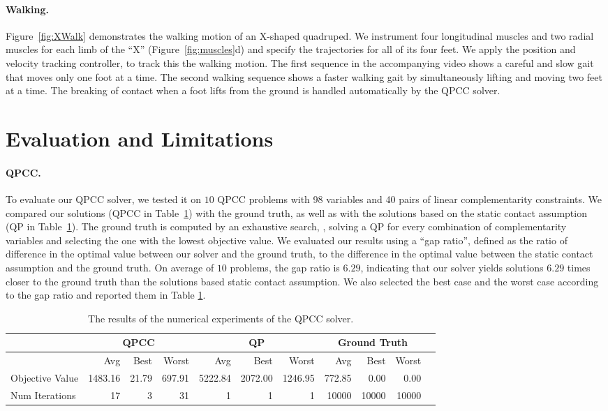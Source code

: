 \paragraph{Walking.} Figure~\ref{fig:XWalk} demonstrates the walking
motion of an X-shaped quadruped. We instrument four longitudinal
muscles and two radial muscles for each limb of the ``X''
(Figure~\ref{fig:muscles}d) and specify the trajectories for all of
its four feet. We apply the position and velocity tracking controller, to track this the walking motion.
The first sequence in the accompanying video shows a careful and slow gait that moves only one
foot at a time. The second walking sequence shows a faster walking
gait by simultaneously lifting and moving two feet at a time. The
breaking of contact when a foot lifts from the ground is handled
automatically by the QPCC solver.

\section{Evaluation and Limitations}
\label{sec:Evaluation}

\paragraph{QPCC.} To evaluate our QPCC solver, we tested it on $10$
QPCC problems with 98 variables and 40 pairs of linear complementarity
constraints. We compared our solutions (QPCC in Table~\ref{tab:qpcc}) with the ground truth, as well
as with the solutions based on the static contact assumption (QP in Table~\ref{tab:qpcc}). The
ground truth is computed by an exhaustive search, \ie, solving a QP
for every combination of complementarity variables and selecting the one
with the lowest objective value. We evaluated our results using a ``gap
ratio'', defined as the ratio of difference in the optimal value between
our solver and the ground truth, to the difference in the optimal value
between the static contact assumption and the ground truth. On average
of $10$ problems, the gap ratio is $6.29$, indicating that our solver
yields solutions $6.29$ times closer to the ground truth than the
solutions based static contact assumption. We also selected the best
case and the worst case according to the gap ratio and reported them
in Table \ref{tab:qpcc}.
\begin{table}
\centering
\begin{tabular}{|l|r|r|r|r|r|r|r|r|r|r|}
\hline
&\multicolumn{3}{|c|}{QPCC} & \multicolumn{3}{|c|}{QP}  & \multicolumn{3}{|c|}{Ground Truth} \\ \hline
& Avg & Best & Worst & Avg & Best & Worst & Avg & Best & Worst \\ \hline
Objective Value & 1483.16 & 21.79 & 697.91 & 5222.84 & 2072.00& 1246.95 & 772.85 & 0.00 & 0.00 \\ \hline
Num Iterations & 17 & 3 & 31 & 1 & 1 & 1 & 10000 & 10000 & 10000 \\
\hline
\end{tabular}
 \caption{The results of the numerical experiments of the QPCC solver. }
 \label{tab:qpcc}
\end{table}

